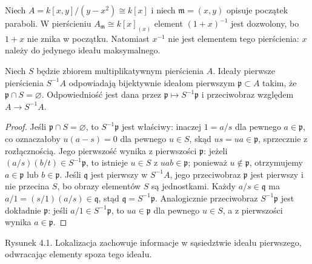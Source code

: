 \begin{przyklad}
Niech $A=k[x,y]/(y-x^2)\cong k[x]$ i niech
$\mathfrak m=(x,y)$ opisuje początek paraboli.
W pierścieniu $A_{\mathfrak m}\cong k[x]_{(x)}$
element $(1+x)^{-1}$ jest dozwolony, bo $1+x$
nie znika w początku. Natomiast $x^{-1}$
nie jest elementem tego pierścienia: $x$ należy
do jedynego ideału maksymalnego.
\end{przyklad}

\begin{twierdzenie}
\label{tw:idealy-loc}
Niech $S$ będzie zbiorem multiplikatywnym pierścienia $A$.
Ideały pierwsze pierścienia $S^{-1}A$ odpowiadają
bijektywnie ideałom pierwszym $\mathfrak p\subset A$
takim, że $\mathfrak p\cap S=\varnothing$.
Odpowiedniość jest dana przez
$\mathfrak p\mapsto S^{-1}\mathfrak p$ i przeciwobraz
względem $A\to S^{-1}A$.
\end{twierdzenie}
\begin{proof}
Jeśli $\mathfrak p\cap S=\varnothing$, to
$S^{-1}\mathfrak p$ jest właściwy: inaczej $1=a/s$
dla pewnego $a\in\mathfrak p$, co oznaczałoby
$u(a-s)=0$ dla pewnego $u\in S$, skąd $us=ua\in\mathfrak p$,
sprzecznie z rozłącznością. Jego pierwszość
wynika z pierwszości $\mathfrak p$: jeżeli
$(a/s)(b/t)\in S^{-1}\mathfrak p$, to istnieje
$u\in S$ z $uab\in\mathfrak p$; ponieważ
$u\notin\mathfrak p$, otrzymujemy $a\in\mathfrak p$
lub $b\in\mathfrak p$.
Jeśli $\mathfrak q$ jest pierwszy w $S^{-1}A$,
jego przeciwobraz $\mathfrak p$ jest pierwszy
i nie przecina $S$, bo obrazy elementów $S$ są
jednostkami. Każdy $a/s\in\mathfrak q$ ma
$a/1=(s/1)(a/s)\in\mathfrak q$, stąd
$\mathfrak q=S^{-1}\mathfrak p$. Analogicznie
przeciwobraz $S^{-1}\mathfrak p$ jest dokładnie
$\mathfrak p$: jeśli $a/1\in S^{-1}\mathfrak p$,
to $ua\in\mathfrak p$ dla pewnego $u\in S$,
a z pierwszości wynika $a\in\mathfrak p$.
\end{proof}

\begin{center}

{\small Rysunek 4.1. Lokalizacja zachowuje informacje w sąsiedztwie ideału pierwszego, odwracając elementy spoza tego ideału.}\par
\end{center}

